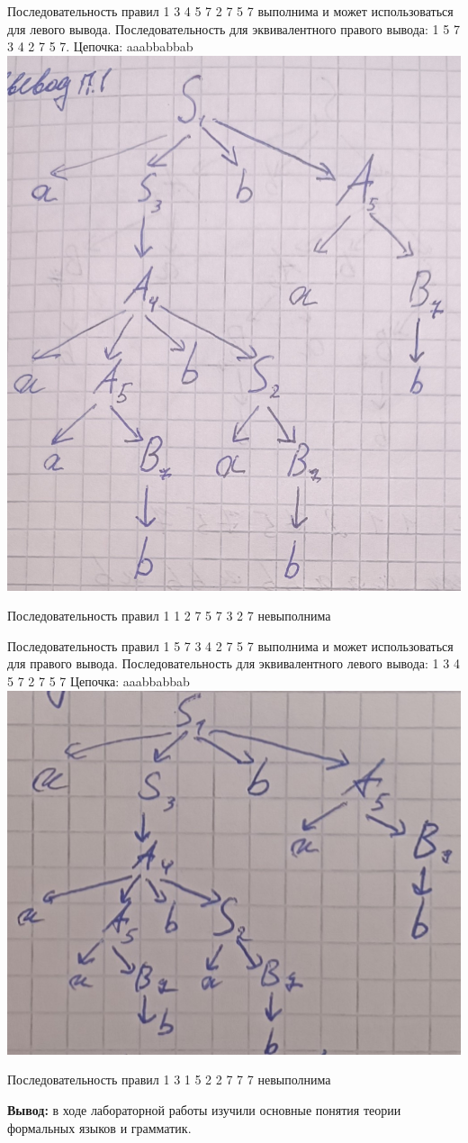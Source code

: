 \documentclass[a4paper,14pt]{extarticle}
\begin{document}
\begin{enumerate}[1.]
    Последовательность правил 1 3 4 5 7 2 7 5 7 выполнима и может использоваться для левого вывода. 
    Последовательность для эквивалентного правого вывода: 1 5 7 3 4 2 7 5 7. 
    Цепочка: aaabbabbab\\
    \includegraphics[width=140mm]{task6_1}\bigbreak

    Последовательность правил 1 1 2 7 5 7 3 2 7 невыполнима \bigbreak
    
    Последовательность правил 1 5 7 3 4 2 7 5 7 выполнима и может использоваться для правого вывода. 
    Последовательность для эквивалентного левого вывода: 1 3 4 5 7 2 7 5 7
    Цепочка: aaabbabbab\\
    \includegraphics[width=140mm]{task6_3}\bigbreak

    Последовательность правил 1 3 1 5 2 2 7 7 7 невыполнима
\end{enumerate}

\textbf{Вывод: } в ходе лабораторной работы изучили основные понятия теории формальных языков и грамматик.
\end{document}

